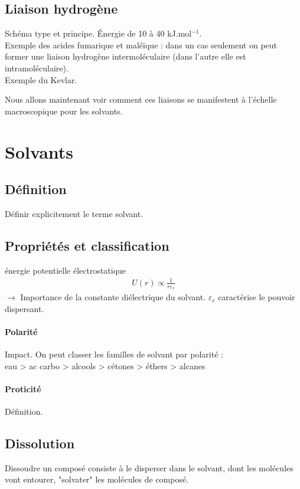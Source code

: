 \documentclass[12pt,prb,aps,epsf]{article}
\begin{document}
\subsection{Liaison hydrogène}
Schéma type et principe. Énergie de 10 à 40 kJ.mol$^{-1}$.\\
Exemple des acides fumarique et maléïque : dans un cas seulement on peut former une liaison hydrogène intermoléculaire (dans l'autre elle est intramoléculaire).\\
Exemple du Kevlar.

Nous allons maintenant voir comment ces liaisons se manifestent à l'échelle macroscopique pour les solvants.

\section{Solvants}
\subsection{Définition}
Définir explicitement le terme solvant.

\subsection{Propriétés et classification}
énergie potentielle électrostatique
\begin{eqnarray}
U(r) \propto \frac{1}{r\varepsilon_r}
\end{eqnarray}
$\rightarrow$ Importance de la constante diélectrique du solvant. $\varepsilon_r$ caractérise le pouvoir dispersant.

\paragraph{Polarité}
Impact. On peut classer les familles de solvant par polarité :\\
eau > ac carbo > alcools > cétones > éthers > alcanes

\paragraph{Proticité}
Définition.

\subsection{Dissolution}
Dissoudre un composé consiste à le disperser dans le solvant, dont les molécules vont entourer, "solvater" les molécules de composé.\\
\end{document}
